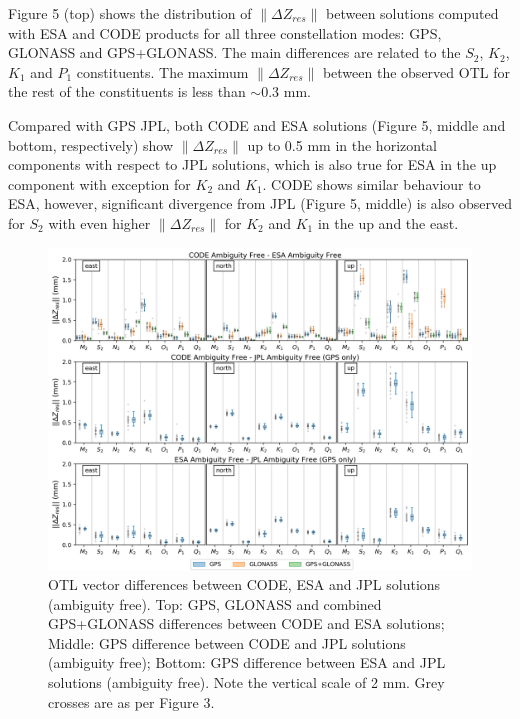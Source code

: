 \documentclass[se, manuscript]{copernicus}
\providecommand{\DIFdelend}{} %
\begin{document}
\DIFdelend Figure 5 (top) shows the distribution of $\|\Delta Z_{res}\|$ between solutions computed with ESA and CODE products for all three constellation modes: GPS, GLONASS and GPS+GLONASS. The main differences are related to the $S_2$, $K_2$, $K_1$ and $P_1$ constituents. The maximum $\|\Delta Z_{res}\|$ between the observed OTL for the rest of the constituents is less than $\sim$0.3 mm.

Compared with GPS JPL, both CODE and ESA solutions (Figure 5, middle and bottom, respectively) show $\|\Delta Z_{res}\|$ up to 0.5 mm in the horizontal components with respect to JPL solutions, which is also true for ESA in the up component with exception for $K_2$ and $K_1$. CODE shows similar behaviour to ESA, however, significant divergence from JPL (Figure 5, middle) is also observed for $S_2$ with even higher $\|\Delta Z_{res}\|$ for $K_2$ and $K_1$ in the up and the east.

\begin{figure}[t]
\includegraphics[width=17cm]{fig05.png}
\caption{OTL vector differences between CODE, ESA and JPL solutions (ambiguity free). Top: GPS, GLONASS and combined GPS+GLONASS differences between CODE and ESA solutions; Middle: GPS difference between CODE and JPL solutions (ambiguity free); Bottom: GPS difference between ESA and JPL solutions (ambiguity free). Note the vertical scale of 2 mm. Grey crosses are as per Figure 3. }
\end{figure}
\end{document}
